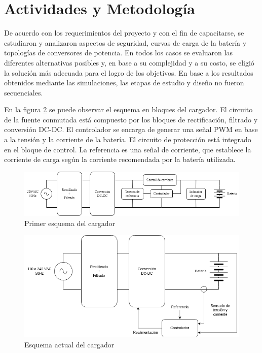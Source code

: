\section{Actividades y Metodología}

De acuerdo con los requerimientos del proyecto y con el fin de capacitarse, se estudiaron y analizaron aspectos de seguridad, 
curvas de carga de la batería y topologías de conversores de potencia.
En todos los casos se evaluaron las diferentes alternativas posibles y, en base a su complejidad y a su costo,
se eligió la solución más adecuada para el logro de los objetivos. 
En base a los resultados obtenidos mediante las simulaciones, las etapas de estudio y diseño no fueron secuenciales. 

En la figura \ref{fig:esquema_cargador} se puede observar el esquema en bloques del cargador.
El circuito de la fuente conmutada está compuesto por los bloques de rectificación, filtrado y conversión DC-DC.
El controlador se encarga de generar una señal PWM en base a la tensión y la corriente de la batería.
El circuito de protección está integrado en el bloque de control.
La referencia es una señal de corriente, que establece la corriente de carga según la corriente recomendada
por la batería utilizada.

\begin{figure}
    \centering
    \includegraphics[width=\textwidth]{images/esquema_cargador_inicial.png}
    \caption{Primer esquema del cargador}
    \label{fig:esquema_cargador_inicial}
\end{figure}

\begin{figure}
    \centering
    \includegraphics[width=\textwidth]{images/esquema_cargador_v2.png}
    \caption{Esquema actual del cargador}
    \label{fig:esquema_cargador}
\end{figure}


